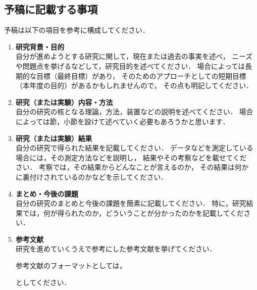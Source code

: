 \documentclass[titlepage]{jarticle}
\begin{document}
\subsection{予稿に記載する事項}
%
予稿は以下の項目を参考に構成してください．
%
\begin{enumerate}
  \item \textbf{研究背景・目的} \\
        自分が進めようとする研究に関して，現在または過去の事実を述べ，
        ニーズや問題点を挙げるなどして，研究目的を述べてください．
        場合によっては長期的な目標（最終目標）があり，
        そのためのアプローチとしての短期目標（本年度の目的）があるかもしれませんので，
        その点も明記してください．
  \item \textbf{研究（または実験）内容・方法} \\
        自分の研究の核となる理論，方法，装置などの説明を述べてください．
        場合によっては節，小節を設けて述べていく必要もあろうかと思います．
  \item \textbf{研究（または実験）結果} \\
        自分の研究で得られた結果を記載してください．
        データなどを測定している場合には，その測定方法などを説明し，
        結果やその考察などを載せてください．
        考察では，その結果からどんなことが言えるのか，
        その結果は何かに裏付けされているのかなどを示してください．
  \item \textbf{まとめ・今後の課題} \\
        自分の研究のまとめと今後の課題を簡素に記載してください．
        特に，研究結果では，何が得られたのか，どういうことが分かったのかを記載してください．
  \item \textbf{参考文献} \\
        研究を進めていくうえで参考にした参考文献を挙げてください．

        参考文献のフォーマットとしては，
        \renewcommand{\labelenumii}{[\arabic{enumii}]}
        \renewcommand{\labelenumii}{\arabic{enumii}}
        としてください．
\end{enumerate}
%
%
\end{document}
